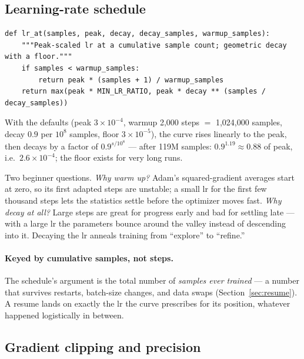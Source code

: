 \documentclass[10pt,a4paper]{article}
\newcommand{\code}[1]{\texttt{#1}}
\begin{document}
\subsection{Learning-rate schedule}

\begin{lstlisting}[style=code, caption={The learning rate as a function of
\emph{cumulative samples trained} (\code{train.py}). Linear warmup, then
geometric decay with a floor at 10\% of the peak.},
label={lst:lr}, float=htbp]
def lr_at(samples, peak, decay, decay_samples, warmup_samples):
    """Peak-scaled lr at a cumulative sample count; geometric decay with a floor."""
    if samples < warmup_samples:
        return peak * (samples + 1) / warmup_samples
    return max(peak * MIN_LR_RATIO, peak * decay ** (samples / decay_samples))
\end{lstlisting}

With the defaults (peak $3\times10^{-4}$, warmup 2{,}000 steps
$=$ 1{,}024{,}000 samples, decay $0.9$ per $10^8$ samples, floor
$3\times10^{-5}$), the curve rises linearly to the peak, then decays by
a factor of $0.9^{s/10^8}$ --- after 119M samples: $0.9^{1.19}\approx
0.88$ of peak, i.e.\ $2.6\times10^{-4}$; the floor exists for very long
runs.

Two beginner questions. \emph{Why warm up?} Adam's squared-gradient
averages start at zero, so its first adapted steps are unstable; a small
lr for the first few thousand steps lets the statistics settle before
the optimizer moves fast. \emph{Why decay at all?} Large steps are great
for progress early and bad for settling late --- with a large lr the
parameters bounce around the valley instead of descending into it.
Decaying the lr anneals training from ``explore'' to ``refine.''

\paragraph{Keyed by cumulative samples, not steps.} The schedule's
argument is the total number of \emph{samples ever trained} --- a number
that survives restarts, batch-size changes, and data swaps
(Section~\ref{sec:resume}). A resume lands on exactly the lr the curve
prescribes for its position, whatever happened logistically in between.

\subsection{Gradient clipping and precision}\label{sec:precision}
\end{document}
